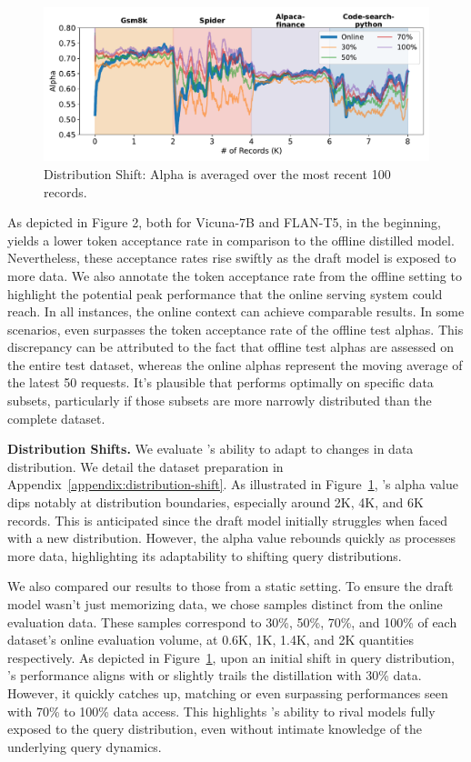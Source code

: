 \begin{figure}      
\vspace{-10pt}
    \centering
    \includegraphics[width=0.75\linewidth]{figures/sharp.pdf}
    \vspace{-15pt}
    \caption{Distribution Shift: Alpha is averaged over the most recent 100 records.}
    \vspace{-15pt}
    \label{fig:dis-shift}
\end{figure}


As depicted in Figure 2, both for Vicuna-7B and FLAN-T5, in the beginning, \tool yields a lower token acceptance rate in comparison to the offline distilled model. Nevertheless, these acceptance rates rise swiftly as the draft model is exposed to more data. We also annotate the token acceptance rate from the offline setting to highlight the potential peak performance that the online serving system could reach. 
In all instances, the online context can achieve comparable results. In some scenarios, \tool even surpasses the token acceptance rate of the offline test alphas. This discrepancy can be attributed to the fact that offline test alphas are assessed on the entire test dataset, whereas the online alphas represent the moving average of the latest 50 requests. It's plausible that \tool performs optimally on specific data subsets, particularly if those subsets are more narrowly distributed than the complete dataset.

{\bf Distribution Shifts.} 
We evaluate \tool's ability to adapt to changes in data distribution. 
We detail the dataset preparation in Appendix~\ref{appendix:distribution-shift}. 
As illustrated in Figure~\ref{fig:dis-shift}, \tool's alpha value dips notably at distribution boundaries, especially around 2K, 4K, and 6K records. 
This is anticipated since the draft model initially struggles when faced with a new distribution. However, the alpha value rebounds quickly as \tool processes more data, highlighting its adaptability to shifting query distributions.

We also compared our results to those from a static setting. To ensure the draft model wasn't just memorizing data, we chose samples distinct from the online evaluation data. These samples correspond to 30\%, 50\%, 70\%, and 100\% of each dataset's online evaluation volume, at 0.6K, 1K, 1.4K, and 2K quantities respectively. As depicted in Figure~\ref{fig:dis-shift}, upon an initial shift in query distribution, \tool's performance aligns with or slightly trails the distillation with 30\% data. However, it quickly catches up, matching or even surpassing performances seen with 70\% to 100\% data access. This highlights \tool's ability to rival models fully exposed to the query distribution, even without intimate knowledge of the underlying query dynamics.

